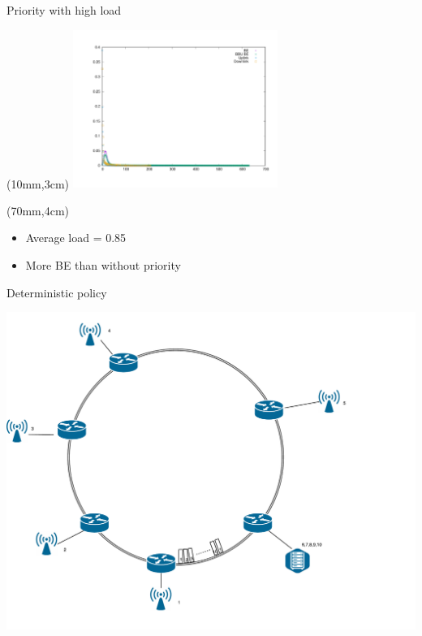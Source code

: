 \documentclass[10 pt]{beamer}
\begin{document}
\begin{frame}{Priority with high load}


  \begin{textblock*}{120mm}(10mm,3cm) %
\includegraphics[width=0.5\textwidth]{Priority_high.pdf} 
\end{textblock*}


  \begin{textblock*}{100mm}(70mm,4cm) %
\begin{itemize}
\item Average load = 0.85
\item More BE than without priority 
\end{itemize}
\end{textblock*}
\end{frame}

\begin{frame}{Deterministic policy}

\hspace{2cm}
\includegraphics[scale=0.35]{slotsanneau.pdf}



\end{frame}
\end{document}

